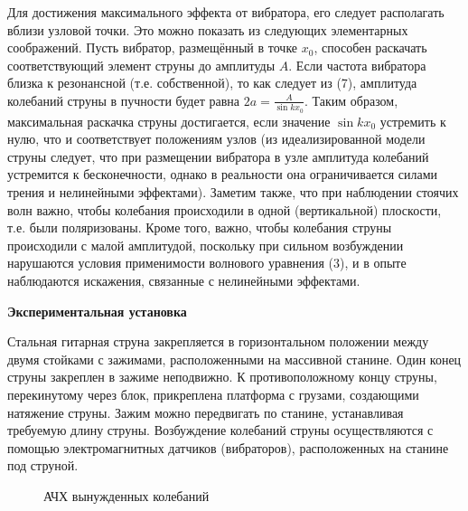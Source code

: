 \documentclass[14pt]{article}
\begin{document}
Для достижения максимального эффекта от вибратора, его следует располагать вблизи узловой точки. Это можно показать из следующих элементарных соображений. Пусть вибратор, размещённый в точке $x_0$, способен раскачать соответствующий элемент струны до амплитуды $A$. Если частота вибратора близка к резонансной (т.е. собственной), то как следует из (7), амплитуда колебаний струны в пучности будет равна 
$2a = \frac{A}{\sin kx_0}$. Таким образом, максимальная раскачка струны достигается, если значение $\sin kx_0$ устремить к нулю, что и соответствует положениям узлов (из идеализированной модели струны следует, что при размещении вибратора в узле амплитуда колебаний устремится к бесконечности, однако в реальности она ограничивается силами трения и нелинейными эффектами). Заметим также, что при наблюдении стоячих волн важно, чтобы колебания происходили в одной (вертикальной) плоскости, т.е. были поляризованы. Кроме того, важно, чтобы колебания струны происходили с малой амплитудой, поскольку при сильном возбуждении нарушаются условия применимости волнового уравнения (3), и в опыте наблюдаются искажения, связанные с нелинейными эффектами. 

\vspace{1cm}
\textbf{Экспериментальная установка}

Стальная гитарная струна закрепляется в горизонтальном положении между двумя стойками с зажимами, расположенными на массивной станине. Один конец струны закреплен в зажиме неподвижно. К противоположному концу струны, перекинутому через блок, прикреплена платформа с грузами, создающими натяжение струны. Зажим можно передвигать по станине, устанавливая требуемую длину струны. Возбуждение колебаний струны осуществляются с помощью электромагнитных датчиков (вибраторов), расположенных на станине под струной.

\begin{figure}[h!]
	\caption{АЧХ вынужденных колебаний}
	\label{fig:image}
\end{figure}
\end{document}
